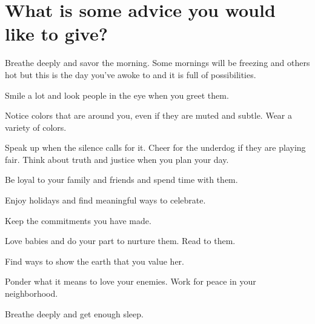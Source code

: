 \section{What is some advice you would like to give?}
Breathe deeply and savor the morning.
Some mornings will be freezing and others hot but this is the day you've awoke to and it is full of possibilities.

Smile a lot and look people in the eye when you greet them.

Notice colors that are around you, even if they are muted and subtle.
Wear a variety of colors.

Speak up when the silence calls for it.
Cheer for the underdog if they are playing fair.
Think about truth and justice when you plan your day.

Be loyal to your family and friends and spend time with them.

Enjoy holidays and find meaningful ways to celebrate.

Keep the commitments you have made.

Love babies and do your part to nurture them.
Read to them.

Find ways to show the earth that you value her.

Ponder what it means to love your enemies.
Work for peace in your neighborhood.

Breathe deeply and get enough sleep.







